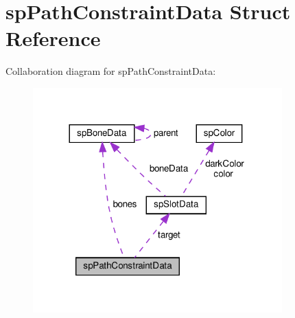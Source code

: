 \hypertarget{structspPathConstraintData}{}\section{sp\+Path\+Constraint\+Data Struct Reference}
\label{structspPathConstraintData}


Collaboration diagram for sp\+Path\+Constraint\+Data\+:
\nopagebreak
\begin{figure}[H]
\begin{center}
\leavevmode
\includegraphics[width=272pt]{structspPathConstraintData__coll__graph}
\end{center}
\end{figure}
